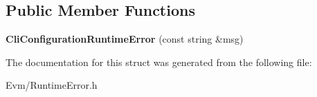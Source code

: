 \subsection*{Public Member Functions}
\begin{DoxyCompactItemize}
\item 
\mbox{\label{struct_evm_1_1_cli_configuration_runtime_error_a8ae06332c5e8cd5e20c923ea5c0f7cec}} 
{\bfseries Cli\+Configuration\+Runtime\+Error} (const string \&msg)
\end{DoxyCompactItemize}


The documentation for this struct was generated from the following file\+:\begin{DoxyCompactItemize}
\item 
Evm/Runtime\+Error.\+h\end{DoxyCompactItemize}
